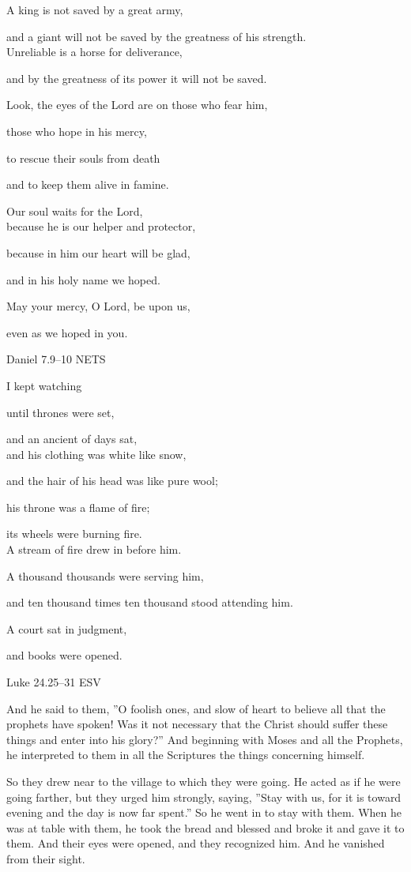 \documentclass[
]{article}
\newcommand{\RL}[1]{\beginR #1\endR}
\begin{document}
A king is not saved by a great army,

and a giant will not be saved by the greatness of his strength.\\
Unreliable is a horse for deliverance,

and by the greatness of its power it will not be saved.

Look, the eyes of the Lord are on those who fear him,

those who hope in his mercy,

to rescue their souls from death

and to keep them alive in famine.

Our soul waits for the Lord,\\
because he is our helper and protector,

because in him our heart will be glad,

and in his holy name we hoped.

May your mercy, O Lord, be upon us,

even as we hoped in you.

Daniel 7.9--10 NETS

I kept watching

until thrones were set,

and an ancient of days sat,\\
and his clothing was white like snow,

and the hair of his head was like pure wool;

his throne was a flame of fire;

its wheels were burning fire.\\
A stream of fire drew in before him.

A thousand thousands were serving him,

and ten thousand times ten thousand stood attending him.

A court sat in judgment,

and books were opened.

Luke 24.25--31 ESV

And he said to them, \RL{''}O foolish ones, and slow of heart to believe
all that the prophets have spoken! Was it not necessary that the Christ
should suffer these things and enter into his glory?'' And beginning
with Moses and all the Prophets, he interpreted to them in all the
Scriptures the things concerning himself.

So they drew near to the village to which they were going. He acted as
if he were going farther, but they urged him strongly, saying,
\RL{''}Stay with us, for it is toward evening and the day is now far
spent.'' So he went in to stay with them. When he was at table with
them, he took the bread and blessed and broke it and gave it to them.
And their eyes were opened, and they recognized him. And he vanished
from their sight.
\end{document}
